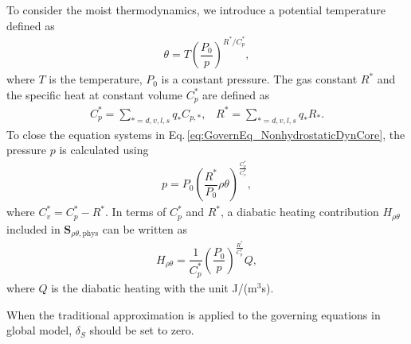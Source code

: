 To consider the moist thermodynamics, 
we introduce a potential temperature defined as 
\begin{align}
  \theta = T \left(\dfrac{P_0}{p}\right)^{R^*/C_p^*}, 
\end{align}
where 
$T$ is the temperature, 
$P_0$ is a constant pressure. 
The gas constant $R^*$ and 
the specific heat at constant volume $C_p^*$ are defined as 
\begin{align}
  C_p^* = \sum_{*=d,v,l,s} q_{*} C_{p,*}, \;\;\;
  R^* = \sum_{*=d,v,l,s} q_{*} R_{*}. 
\end{align}
To close the equation systems in Eq.\,\eqref{eq:GovernEq_NonhydrostaticDynCore}, 
the pressure $p$ is calculated using
\begin{align}
    p=P_0 \left(\dfrac{R^*}{P_0} \rho \theta  \right)^{\frac{C_{p}^*}{C_{v}^*}}, 
\end{align}
where $C_v^* = C_p^* - R^*$.  
In terms of $C_p^*$ and $R^*$, 
a diabatic heating contribution $H_{\rho \theta}$ included in $\bm{S}_{\rho \theta,\textrm{phys}}$ can be written as
\begin{align}
  H_{\rho \theta} = \dfrac{1}{C_p^*} \left(\dfrac{P_0}{p}\right)^{\frac{R^*}{C_p^*}} Q,
\end{align}
where $Q$ is the diabatic heating with the unit J/(m$^3$s).


When the traditional approximation is applied to the governing equations in global model, 
$\delta_S$ should be set to zero.
